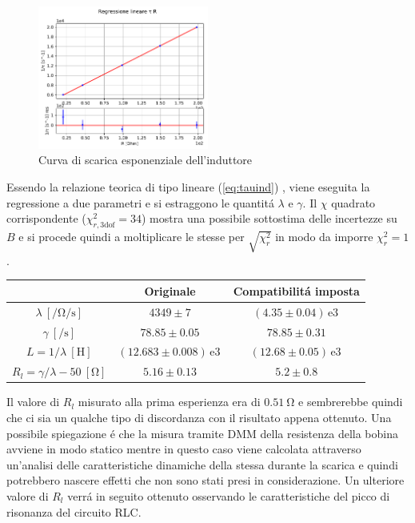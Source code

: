 \documentclass{article}
\newcommand{\E}[1]{\, \mathrm{e}{#1} \, }
\begin{document}
\begin{figure}[h]
	\centering
	\includegraphics[width=0.5\textwidth]{fig_tau2.pdf}
	\caption{Curva di scarica esponenziale dell'induttore}
	\label{fig:fig_tau2}
\end{figure}

Essendo la relazione teorica di tipo lineare (\ref{eq:tauind}) , viene eseguita la regressione a due parametri e si estraggono le quantit\'a $\lambda$ e $\gamma$. Il $\chi$ quadrato corrispondente ($\chi^2_{r,3 \mathrm{dof}}=34$) mostra una possibile sottostima delle incertezze su $B$ e si procede quindi a moltiplicare le stesse per $\sqrt{\chi^2_r}$ in modo da imporre $\chi^2_r=1$.

\begin{center}
\begin{tabular}{c | c c }
	& Originale & Compatibilit\'a imposta \\
	\hline
 $\lambda \ [\si{\per\ohm\per\second}]$ & $4349\pm 7$  & $ (4.35\pm 0.04)\E{3} $\\
 $\gamma \ [\si{\per\second}]$ & $78.85\pm 0.05$ & $78.85\pm 0.31 $ \\
 $L = 1/\lambda \ [\si{\henry}]$ & $ (12.683 \pm 0.008)\E{3} $ & $ (12.68\pm 0.05)\E{3} $ \\
 $R_l = \gamma/\lambda - 50 \ [\si{\ohm}]$ & $5.16\pm 0.13$ & $5.2\pm 0.8$ \\
\end{tabular}
\end{center}

Il valore di $R_l$ misurato alla prima esperienza era di $0.51 \ \si{\ohm}$ e sembrerebbe quindi che ci sia un qualche tipo di discordanza con il risultato appena ottenuto. Una possibile spiegazione \'e che la misura tramite DMM della resistenza della bobina avviene in modo statico mentre in questo caso viene calcolata attraverso un'analisi delle caratteristiche dinamiche della stessa durante la scarica e quindi potrebbero nascere effetti che non sono stati presi in considerazione. Un ulteriore valore di $R_l$ verr\'a in seguito ottenuto osservando le caratteristiche del picco di risonanza del circuito RLC.
\end{document}
